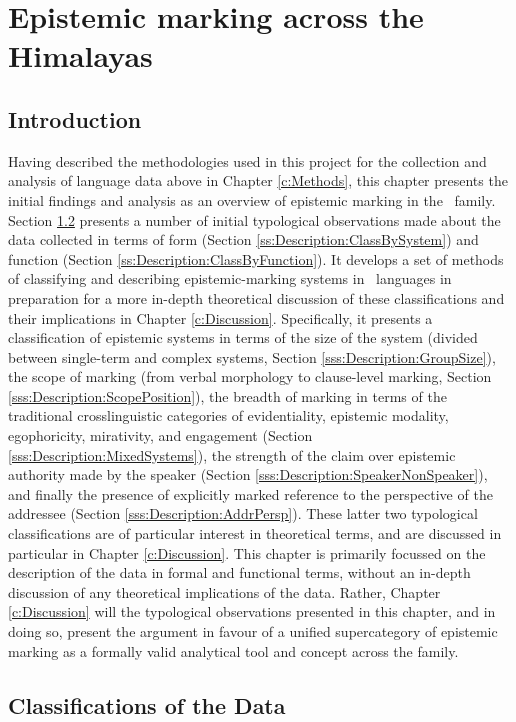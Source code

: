 \chapter{Epistemic marking across the Himalayas}\label{c:Description}
\section{Introduction}
Having described the methodologies used in this project for the collection and analysis of language data above in Chapter \ref{c:Methods}, this chapter presents the initial findings and analysis as an overview of epistemic marking in the \lfam\ family. Section \ref{s:Description:Classifications} presents a number of initial typological observations made about the data collected in terms of form (Section \ref{ss:Description:ClassBySystem}) and function (Section \ref{ss:Description:ClassByFunction}). It develops a set of methods of classifying and describing epistemic-marking systems in \lfam\ languages in preparation for a more in-depth theoretical discussion of these classifications and their implications in Chapter \ref{c:Discussion}. Specifically, it presents a classification of epistemic systems in terms of the size of the system (divided between single-term and complex systems, Section \ref{sss:Description:GroupSize}), the scope of marking (from verbal morphology to clause-level marking, Section \ref{sss:Description:ScopePosition}), the breadth of marking in terms of the traditional crosslinguistic categories of evidentiality, epistemic modality, egophoricity, mirativity, and engagement (Section \ref{sss:Description:MixedSystems}), the strength of the claim over epistemic authority made by the speaker (Section \ref{sss:Description:SpeakerNonSpeaker}), and finally the presence of explicitly marked reference to the perspective of the addressee (Section \ref{sss:Description:AddrPersp}). These latter two typological classifications are of particular interest in theoretical terms, and are discussed in particular in Chapter \ref{c:Discussion}. This chapter is primarily focussed on the description of the data in formal and functional terms, without an in-depth discussion of any theoretical implications of the data. Rather, Chapter \ref{c:Discussion} will the typological observations presented in this chapter, and in doing so, present the argument in favour of a unified supercategory of epistemic marking as a formally valid analytical tool and concept across the family.

\section{Classifications of the Data}\label{s:Description:Classifications}
